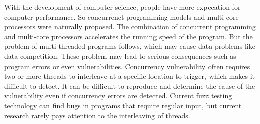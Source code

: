 With the development of computer science, people have more expecation for computer performance. So concurrenct programming models and multi-core processors were naturally proposed. The combination of concurrent programming and multi-core processors accelerates the running speed of the program. But the problem of multi-threaded programs follows, which may cause data problems like data competition. These problem may lead to serious consequences such as program errors or even vulnerabilities. Concurrency vulnerability often requires two or more threads to interleave at a specific location to trigger, which makes it difficult to detect. It can be difficult to reproduce and determine the cause of the vulnerability even if concurrency errors are detected. Current fuzz testing technology can find bugs in programs that require regular input, but current research rarely pays attention to the interleaving of threads.




